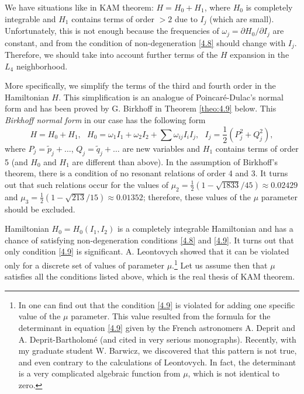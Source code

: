 \begin{example}
	We have situations like in KAM theorem: $H=H_{0}+H_{1}$, where $H_0$ is completely integrable and $H_1$ contains terms of order $> 2$ due to $I_{j}$ (which are small). Unfortunately, this is not enough because the frequencies of $\omega _{j}=\partial H_{0}/\partial I_{j}$ are constant, and from the condition of non-degeneration \eqref{4.8} should change with $I_{j}$. Therefore, we should take into account further terms of the $H$ expansion in the $L_4$ neighborhood.
	
	More specifically, we simplify the terms of the third and fourth order in the Hamiltonian $H$. This simplification is an analogue of Poincaré-Dulac's normal form and has been proved by G. Birkhoff in Theorem \ref{theo:4.9} below. This \emph{Birkhoff normal form} in our case has the following form
	\begin{equation}
	\label{4.11}
	H=H_{0}+H_{1},\text{ \ }H_{0}=\omega _{1}I_{1}+\omega _{2}I_{2}+\sum \omega
	_{ij}I_{i}I_{j},\text{ \ }I_{j}=\frac{1}{2}(P_{j}^{2}+Q_{j}^{2}),
	\end{equation}
	where $P_{j}=\tilde{p}_{j}+\ldots$, $Q_{j}=\tilde{q}_{j}+\ldots $ are new variables and $H_1$ contains terms of order 5 (and $H_0$ and $H_1$ are different than above). In the assumption of Birkhoff's theorem, there is a condition of no resonant relations of order 4 and 3. It turns out that such relations occur for the values of $\mu_{2}=\frac{1}{2}\left( 1-\sqrt{1833}/45\right) \approx 0.02429$ and $\mu _{3}=\frac{1}{2}\left( 1-\sqrt{213}/15\right) \approx 0.01352$; therefore, these values of the $\mu$ parameter should be excluded.
	
	Hamiltonian $H_{0}=H_{0}(I_{1},I_{2})$ is a completely integrable Hamiltonian and has a chance of satisfying non-degeneration conditions \eqref{4.8} and \eqref{4.9}. It turns out that only condition \eqref{4.9} is significant. A. Leontovych showed that it can be violated only for a discrete set of values of parameter $\mu$.\footnote{In \cite{Zol1} one can find out that the condition \eqref{4.9} is violated for adding one specific value of the $\mu$ parameter. This value resulted from the formula for the determinant in equation \eqref{4.9} given by the French astronomers A. Deprit and A. Deprit-Bartholomé (and cited in very serious monographs). Recently, with my graduate student W. Barwicz, we discovered that this pattern is not true, and even contrary to the calculations of Leontovych. In fact, the determinant is a very complicated algebraic function from $\mu$, which is not identical to zero.} Let us assume then that $\mu$ satisfies all the conditions listed above, which is the real thesis of KAM theorem.
	

\end{example}
